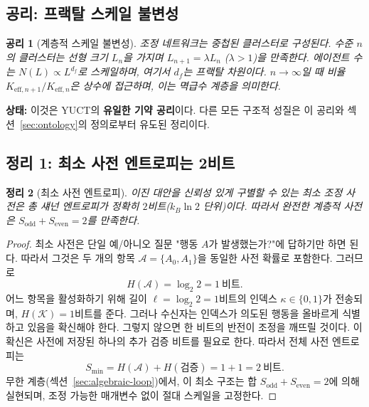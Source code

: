 \documentclass[12pt,a4paper]{article}
\newtheorem{theorem}{정리}[section]
\newtheorem{axiom}[theorem]{공리}
\begin{document}
	\subsection{공리: 프랙탈 스케일 불변성}
	
	\begin{axiom}[계층적 스케일 불변성] \label{ax:A1}
		조정 네트워크는 중첩된 클러스터로 구성된다. 수준 \(n\)의 클러스터는 선형 크기 \(L_n\)을 가지며 \(L_{n+1} = \lambda L_n\) (\(\lambda > 1\))을 만족한다. 에이전트 수는 \(N(L) \propto L^{d_f}\)로 스케일하며, 여기서 \(d_f\)는 프랙탈 차원이다. \(n \to \infty\)일 때 비율 \(K_{\mathrm{eff},n+1}/K_{\mathrm{eff},n}\)은 상수에 접근하며, 이는 멱급수 계층을 의미한다.
	\end{axiom}
	
	\textbf{상태:} 이것은 YUCT의 \textbf{유일한 기약 공리}이다. 다른 모든 구조적 성질은 이 공리와 섹션~\ref{sec:ontology}의 정의로부터 유도된 정리이다.
	
	\subsection{정리 1: 최소 사전 엔트로피는 2비트}
	
	\begin{theorem}[최소 사전 엔트로피]
		\label{thm:minimal-dict}
		이진 대안을 신뢰성 있게 구별할 수 있는 최소 조정 사전은 총 섀넌 엔트로피가 정확히 \(2\)비트(\(k_B\ln 2\) 단위)이다. 따라서 완전한 계층적 사전은 \(S_{\mathrm{odd}} + S_{\mathrm{even}} = 2\)를 만족한다.
	\end{theorem}
	
	\begin{proof}
		최소 사전은 단일 예/아니오 질문 "행동 \(A\)가 발생했는가?"에 답하기만 하면 된다. 따라서 그것은 두 개의 항목 \(\mathcal{A} = \{A_0, A_1\}\)을 동일한 사전 확률로 포함한다. 그러므로
		\[
		H(\mathcal{A}) = \log_2 2 = 1\ \text{비트}.
		\]
		어느 항목을 활성화하기 위해 길이 \(\ell = \log_2 2 = 1\)비트의 인덱스 \(\kappa \in \{0,1\}\)가 전송되며, \(H(\mathcal{K}) = 1\)비트를 준다. 그러나 수신자는 인덱스가 의도된 행동을 올바르게 식별하고 있음을 확신해야 한다. 그렇지 않으면 한 비트의 반전이 조정을 깨뜨릴 것이다. 이 확신은 사전에 저장된 하나의 추가 검증 비트를 필요로 한다. 따라서 전체 사전 엔트로피는
		\[
		S_{\min} = H(\mathcal{A}) + H(\text{검증}) = 1 + 1 = 2\ \text{비트}.
		\]
		무한 계층(섹션~\ref{sec:algebraic-loop})에서, 이 최소 구조는 합 \(S_{\mathrm{odd}} + S_{\mathrm{even}} = 2\)에 의해 실현되며, 조정 가능한 매개변수 없이 절대 스케일을 고정한다.
	\end{proof}
	
\end{document}
